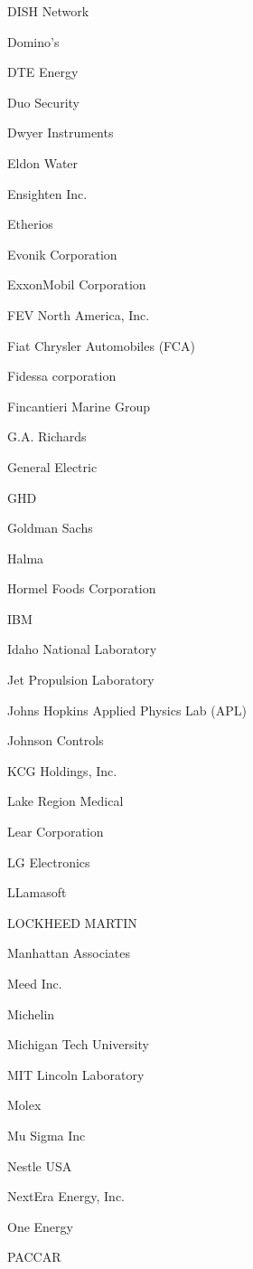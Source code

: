 \documentclass[twoside]{article}
\begin{document}
\begin{center}
\begin{multicols}{5}
\begin{FlushLeft}
\begin{compactitem}
\item DISH Network
\item Domino's
\item DTE Energy
\item Duo Security
\item Dwyer Instruments
\item Eldon Water
\item Ensighten Inc.
\item Etherios
\item Evonik Corporation
\item ExxonMobil Corporation
\item FEV North America, Inc.
\item Fiat Chrysler Automobiles (FCA)
\item Fidessa corporation
\item Fincantieri Marine Group
\item G.A. Richards
\item General Electric
\item GHD
\item Goldman Sachs
\item Halma
\item Hormel Foods Corporation
\item IBM
\item Idaho National Laboratory
\item Jet Propulsion Laboratory
\item Johns Hopkins Applied Physics Lab (APL)
\item Johnson Controls
\item KCG Holdings, Inc.
\item Lake Region Medical
\item Lear Corporation
\item LG Electronics
\item LLamasoft
\item LOCKHEED MARTIN
\item Manhattan Associates
\item Meed Inc.
\item Michelin
\item Michigan Tech University
\item MIT Lincoln Laboratory
\item Molex
\item Mu Sigma Inc
\item Nestle USA
\item NextEra Energy, Inc.
\item One Energy
\item PACCAR

\end{compactitem}
\end{FlushLeft}
\end{multicols}
\end{center}
\end{document}
